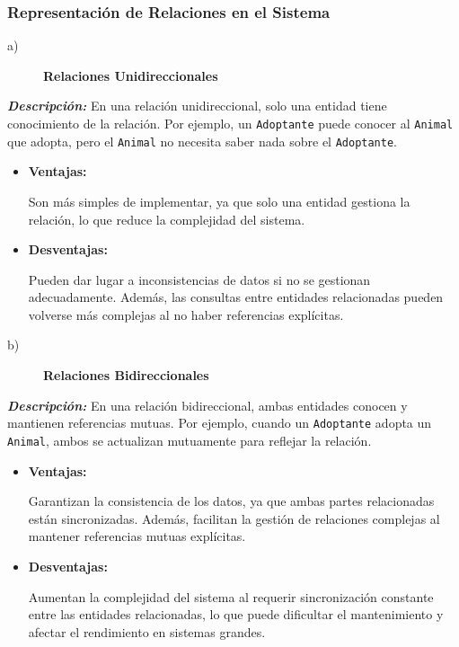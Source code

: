 \subsubsection{Representación de Relaciones en el Sistema}

\begin{description}
    \item[a)] \textbf{Relaciones Unidireccionales}
\end{description}

\textit{\textbf{Descripción:}}  
En una relación unidireccional, solo una entidad tiene conocimiento de la relación. 
Por ejemplo, un \texttt{Adoptante} puede conocer al \texttt{Animal} que adopta, 
pero el \texttt{Animal} no necesita saber nada sobre el \texttt{Adoptante}.

\begin{itemize}
    \item \textbf{Ventajas:}\par
    Son más simples de implementar, ya que solo una entidad gestiona la relación, 
    lo que reduce la complejidad del sistema.
    \item \textbf{Desventajas:}\par
    Pueden dar lugar a inconsistencias de datos si no se gestionan adecuadamente. 
    Además, las consultas entre entidades relacionadas pueden volverse más complejas 
    al no haber referencias explícitas.
\end{itemize}


\begin{description}
    \item[b)] \textbf{Relaciones Bidireccionales}
\end{description}

\textit{\textbf{Descripción:}}  
En una relación bidireccional, ambas entidades conocen y mantienen referencias mutuas. 
Por ejemplo, cuando un \texttt{Adoptante} adopta un \texttt{Animal}, ambos se actualizan 
mutuamente para reflejar la relación.

\begin{itemize}
    \item \textbf{Ventajas:}\par
    Garantizan la consistencia de los datos, ya que ambas partes relacionadas están 
    sincronizadas. Además, facilitan la gestión de relaciones complejas al mantener 
    referencias mutuas explícitas.
    \item \textbf{Desventajas:}\par
    Aumentan la complejidad del sistema al requerir sincronización constante entre las 
    entidades relacionadas, lo que puede dificultar el mantenimiento y afectar el 
    rendimiento en sistemas grandes.
\end{itemize}

